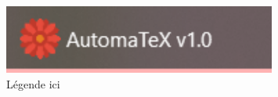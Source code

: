\begin{figure}[h!]
    \centering
    \includegraphics[width=0.8\textwidth]{figures/fig5.png}
    \caption{Légende ici}
    \label{fig:fig5}
\end{figure}


